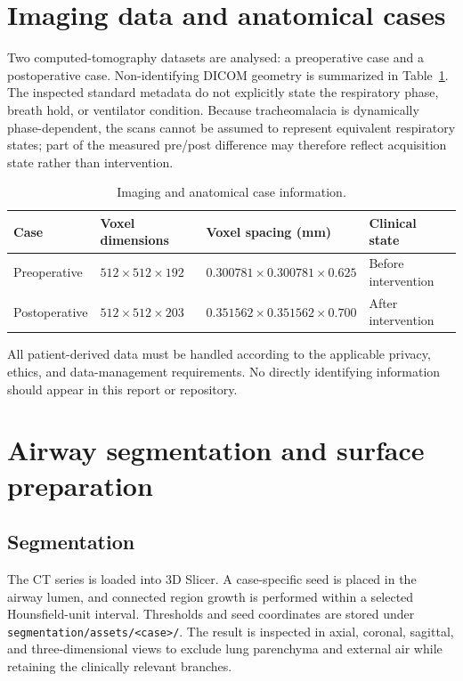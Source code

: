 \documentclass[11pt,a4paper]{article}
\begin{document}
\section{Imaging data and anatomical cases}
\label{sec:data}

Two computed-tomography datasets are analysed: a preoperative case and a
postoperative case. Non-identifying DICOM geometry is summarized in
Table~\ref{tab:imaging}. The inspected standard metadata do not explicitly state
the respiratory phase, breath hold, or ventilator condition. Because
tracheomalacia is dynamically phase-dependent, the scans cannot be assumed to
represent equivalent respiratory states; part of the measured pre/post
difference may therefore reflect acquisition state rather than intervention.

\begin{table}[htbp]
  \centering
  \caption{Imaging and anatomical case information.}
  \label{tab:imaging}
  \begin{tabular}{@{}llll@{}}
    \toprule
    Case & Voxel dimensions & Voxel spacing (mm) & Clinical state \\
    \midrule
    Preoperative  & $512\times512\times192$ & $0.300781\times0.300781\times0.625$ & Before intervention \\
    Postoperative & $512\times512\times203$ & $0.351562\times0.351562\times0.700$ & After intervention \\
    \bottomrule
  \end{tabular}
\end{table}

All patient-derived data must be handled according to the applicable privacy,
ethics, and data-management requirements. No directly identifying information
should appear in this report or repository.

\section{Airway segmentation and surface preparation}
\label{sec:segmentation}

\subsection{Segmentation}

The CT series is loaded into 3D Slicer. A case-specific seed is placed in the
airway lumen, and connected region growth is performed within a selected
Hounsfield-unit interval. Thresholds and seed coordinates are stored under
\texttt{segmentation/assets/<case>/}. The result is inspected in axial,
coronal, sagittal, and three-dimensional views to exclude lung parenchyma and
external air while retaining the clinically relevant branches.
\end{document}
